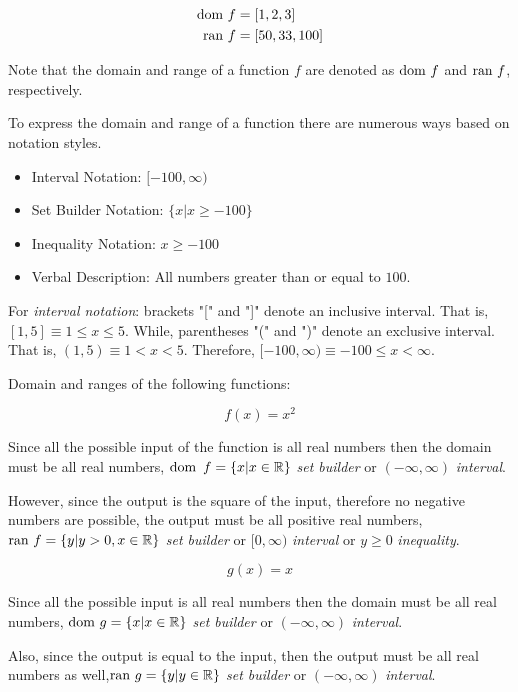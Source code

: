 \begin{align*}
    \text{dom } f &= [1,2,3]\\
    \text{ran } f &= [50,33,100]
\end{align*}

Note that the domain and range of a function \(f\) are denoted as \(\text{dom } f\) and \(\text{ran } f\), respectively.

To express the domain and range of a function there are numerous ways based on notation styles.
\begin{itemize}
    \item Interval Notation: \([-100, \infty)\)
    \item Set Builder Notation: \(\{x | x \geq -100\}\)
    \item Inequality Notation: \(x \geq -100\)
    \item Verbal Description: All numbers greater than or equal to \(100\).
\end{itemize}

For \emph{interval notation}: brackets "[" and "]" denote an inclusive interval. That is, \([1,5] \equiv 1 \leq x \leq 5\). While, parentheses "(" and ")" denote an exclusive interval. That is, \((1,5) \equiv 1 < x < 5\). Therefore, \([-100, \infty) \equiv -100 \leq x < \infty\).

\begin{ex}
    Domain and ranges of the following functions: 
\end{ex}

{\color{blue}\[
    f(x)=x^2
\]}

Since all the possible input of the function is all real numbers then the domain must be all real numbers, \(\text{dom } \, f = \{x|x \in \mathbb{R}\}\) \emph{set builder} or \((-\infty,\infty)\)  \emph{interval}. 

However, since the output is the square of the input, therefore no negative numbers are possible, the output must be all positive real numbers, \(\text{ran } f = \{y|y>0, x\in\mathbb{R}\}\) \emph{set builder} or \([0,\infty)\) \emph{interval} or \(y \geq 0\) \emph{inequality}.

{\color{blue}\[
    g(x)=x
\]}

Since all the possible input is all real numbers then the domain must be all real numbers, \(\text{dom } g = \{x|x \in \mathbb{R}\}\) \emph{set builder} or \((-\infty,\infty)\)  \emph{interval}. 

Also, since the output is equal to the input, then the output must be all real numbers as well,\(\text{ran } g = \{y|y \in \mathbb{R}\}\) \emph{set builder} or \((-\infty,\infty)\)  \emph{interval}. 

